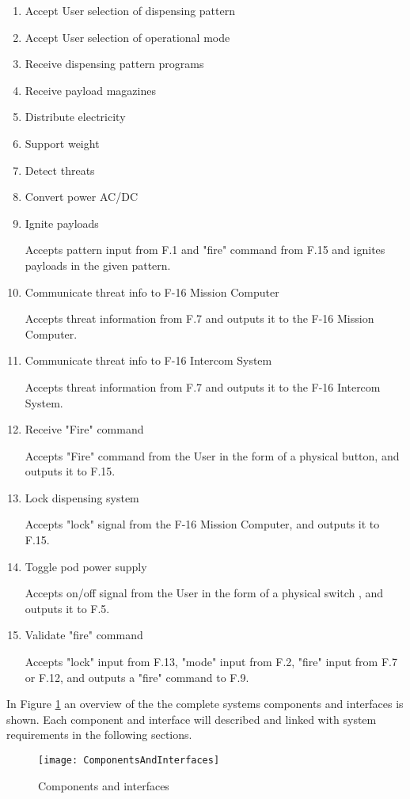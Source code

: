 \documentclass[Main]{subfiles}
\begin{document}
\begin{enumerate}[label=F.\arabic*:]
\item Accept User selection of dispensing pattern
\item Accept User selection of operational mode
\item Receive dispensing pattern programs
\item Receive payload magazines
\item Distribute electricity
\item Support weight
\item Detect threats
\item Convert power AC/DC
\item Ignite payloads

Accepts pattern input from F.1 and "fire" command from F.15 and ignites payloads in the given pattern.

\item Communicate threat info to F-16 Mission Computer

Accepts threat information from F.7 and outputs it to the F-16 Mission Computer.

\item Communicate threat info to F-16 Intercom System

Accepts threat information from F.7 and outputs it to the F-16 Intercom System.

\item Receive "Fire" command

Accepts "Fire" command from the User in the form of a physical button, and outputs it to F.15.

\item Lock dispensing system

Accepts "lock" signal from the F-16 Mission Computer, and outputs it to F.15.

\item Toggle pod power supply

Accepts on/off signal from the User in the form of a physical switch , and outputs it to F.5.

\item Validate "fire" command

Accepts "lock" input from F.13, "mode" input from F.2, "fire" input from F.7 or F.12, and outputs a "fire" command to F.9.

\end{enumerate}


In Figure \ref{fig:ComponentsAndInterfaces} an overview of the the complete systems components and interfaces is shown. Each component and interface will described and linked with system requirements in the following sections.

\begin{figure}[H]
\centering
\texttt{[image: ComponentsAndInterfaces]}
\caption{Components and interfaces}
\label{fig:ComponentsAndInterfaces}
\end{figure}


\newpage

\newpage

\end{document}
